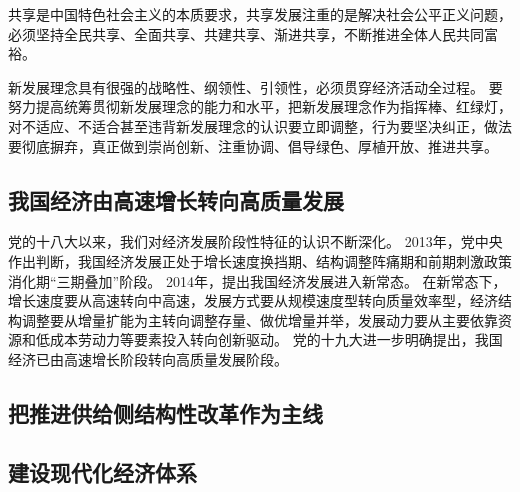 \documentclass[a4paper, UTF8]{ctexart}
\begin{document}
    共享是中国特色社会主义的本质要求，共享发展注重的是解决社会公平正义问题，必须坚持全民共享、全面共享、共建共享、渐进共享，不断推进全体人民共同富裕。

    新发展理念具有很强的战略性、纲领性、引领性，必须贯穿经济活动全过程。
    要努力提高统筹贯彻新发展理念的能力和水平，把新发展理念作为指挥棒、红绿灯，对不适应、不适合甚至违背新发展理念的认识要立即调整，行为要坚决纠正，做法要彻底摒弃，真正做到崇尚创新、注重协调、倡导绿色、厚植开放、推进共享。

    \subsection{我国经济由高速增长转向高质量发展}
    党的十八大以来，我们对经济发展阶段性特征的认识不断深化。
    2013年，党中央作出判断，我国经济发展正处于增长速度换挡期、结构调整阵痛期和前期刺激政策消化期“三期叠加”阶段。
    2014年，提出我国经济发展进入新常态。
    在新常态下，增长速度要从高速转向中高速，发展方式要从规模速度型转向质量效率型，经济结构调整要从增量扩能为主转向调整存量、做优增量并举，发展动力要从主要依靠资源和低成本劳动力等要素投入转向创新驱动。
    党的十九大进一步明确提出，我国经济已由高速增长阶段转向高质量发展阶段。

    \subsection{把推进供给侧结构性改革作为主线}
    
    \subsection{建设现代化经济体系}
    
\end{document}
